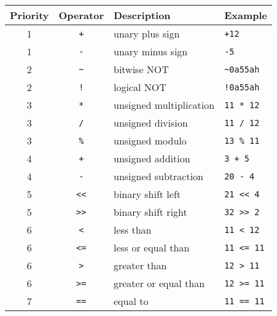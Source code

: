         \begin{table}[h!]
            \centering
            \begin{tabular}{|c|c|l|l|}
                \hline
                \textbf{Priority} & \textbf{Operator} & \textbf{Description} & \textbf{Example} \\\hline
                1        & \texttt{+}    & unary plus sign         & \texttt{+12}               \\\hline
                1        & \texttt{-}    & unary minus sign        & \texttt{-5}                \\\hline
                2        & \texttt{\~{}} & bitwise NOT             & \texttt{\~{}0a55ah}        \\\hline
                2        & \texttt{!}    & logical NOT             & \texttt{!0a55ah}           \\\hline
                3        & \texttt{*}    & unsigned multiplication & \texttt{11 * 12}           \\\hline
                3        & \texttt{/}    & unsigned division       & \texttt{11 / 12}           \\\hline
                3        & \texttt{\%}   & unsigned modulo         & \texttt{13 \% 11}          \\\hline
                4        & \texttt{+}    & unsigned addition       & \texttt{3 + 5}             \\\hline
                4        & \texttt{-}    & unsigned subtraction    & \texttt{20 - 4}            \\\hline
                5        & \texttt{<{}<} & binary shift left       & \texttt{21 <{}< 4}         \\\hline
                5        & \texttt{>{}>} & binary shift right      & \texttt{32 >{}> 2}         \\\hline
                6        & \texttt{<}    & less than               & \texttt{11 < 12}           \\\hline
                6        & \texttt{<=}   & less or equal than      & \texttt{11 <= 11}          \\\hline
                6        & \texttt{>}    & greater than            & \texttt{12 > 11}           \\\hline
                6        & \texttt{>=}   & greater or equal than   & \texttt{12 >= 11}          \\\hline
                7        & \texttt{==}   & equal to                & \texttt{11 == 11}          \\\hline

\end{tabular}
\end{table}
